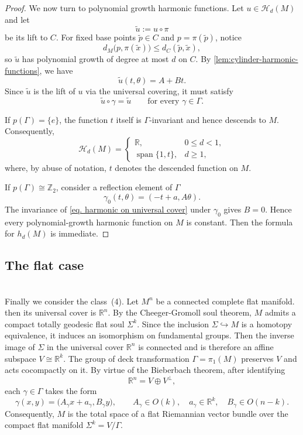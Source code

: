 \documentclass[12pt]{amsart}
\theoremstyle{plain}
\theoremstyle{definition}
\theoremstyle{remark}     %
\numberwithin{equation}{section}
\begin{document}
\begin{proof}
We now turn to polynomial growth harmonic functions.  Let
$u\in\mathcal H_d(M)$ and let
\[
\widetilde u:=u\circ\pi
\]
be its lift to $C$.  For fixed base points
$\widetilde p\in C$ and $p=\pi(\widetilde p)$, notice
\[
d_M\bigl(p,\pi(\widetilde x)\bigr)
\leq
d_{ C}(\widetilde p,\widetilde x),
\]
so $\widetilde u$ has polynomial growth of degree at most $d$ on
$ C$.  By \cref{lem:cylinder-harmonic-functions}, we have
\begin{equation}\label{eq. harmonic on universal cover}
    \widetilde u(t,\theta)=A+Bt.
\end{equation}
Since $\widetilde u$ is the lift of $u$ via the universal covering, it must satisfy
\[
\widetilde u\circ\gamma=\widetilde u
\qquad\text{for every }\gamma\in\Gamma.
\]

If $p(\Gamma)=\{e\}$, the function $t$ itself is $\Gamma$-invariant
and hence descends to $M$.  Consequently,
\[
\mathcal H_d(M)
=
\begin{cases}
\mathbb R, & 0\leq d<1,\\[1mm]
\operatorname{span}\{1,t\}, & d\geq1,
\end{cases}
\]
where, by abuse of notation, $t$ denotes the descended function on
$M$.

If $p(\Gamma)\cong\mathbb Z_2$, consider a reflection element of $\Gamma$
\[
\gamma_0(t,\theta)=(-t+a,A\theta).
\]
The invariance of \cref{eq. harmonic on universal cover} under $\gamma_0$ gives
 $B=0.$
Hence every polynomial-growth harmonic function on $M$ is constant. Then the formula for $h_d(M)$ is immediate. 
\end{proof}

\subsection{The flat case}
\ \\
Finally we consider the class~(4).  Let $M^n$ be a connected complete flat manifold. then its universal cover is $\mathbb{R}^n$. By the Cheeger-Gromoll soul theorem, $M$ admits a compact
totally geodesic flat soul $\Sigma^k$.  Since the inclusion
$\Sigma \hookrightarrow M$ is a homotopy equivalence, it induces an isomorphism on fundamental groups. Then the inverse image of $\Sigma$ in the universal cover $\mathbb R^n$ is connected and is
therefore an affine subspace $V\cong\mathbb R^k$.  The group of deck transformation 
$\Gamma=\pi_1(M)$ preserves $V$ and acts cocompactly on it. By  virtue of the Bieberbach theorem,
after identifying
\[
\mathbb R^n=V\oplus V^\perp,
\]
each $\gamma\in\Gamma$ takes the form
\[
\gamma(x,y)
=
\bigl(A_\gamma x+a_\gamma,B_\gamma y\bigr),
\qquad
A_\gamma\in O(k),\quad a_{\gamma} \in \mathbb{R}^k, \quad 
B_\gamma\in O(n-k).
\]
Consequently, $M$ is the total space of a flat Riemannian vector
bundle over the compact flat manifold $\Sigma^k=V/\Gamma$.
\end{document}
